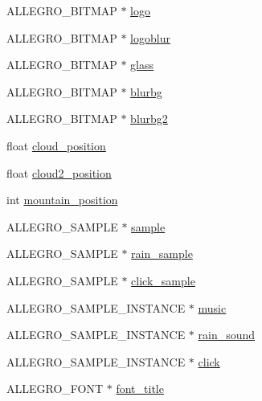 \begin{DoxyCompactItemize}
A\+L\+L\+E\+G\+R\+O\+\_\+\+B\+I\+T\+M\+A\+P $\ast$ \hyperlink{structMenuResources_a11983415130445869f26bda4d12272e6}{logo}
\item 
A\+L\+L\+E\+G\+R\+O\+\_\+\+B\+I\+T\+M\+A\+P $\ast$ \hyperlink{structMenuResources_a3dfab6a60817a4d1ca567c972e95f8b3}{logoblur}
\item 
A\+L\+L\+E\+G\+R\+O\+\_\+\+B\+I\+T\+M\+A\+P $\ast$ \hyperlink{structMenuResources_a46790a4783f1ab503b94de8e0d1ee587}{glass}
\item 
A\+L\+L\+E\+G\+R\+O\+\_\+\+B\+I\+T\+M\+A\+P $\ast$ \hyperlink{structMenuResources_a8e652f336e85c83f1ddfeb7cf093fcfe}{blurbg}
\item 
A\+L\+L\+E\+G\+R\+O\+\_\+\+B\+I\+T\+M\+A\+P $\ast$ \hyperlink{structMenuResources_a531163276d29cb01f2f7101ce460bc07}{blurbg2}
\item 
float \hyperlink{structMenuResources_a11df2c99d7ff4f2435a02c8a162c99fd}{cloud\+\_\+position}
\item 
float \hyperlink{structMenuResources_aef1e5d473ec00f1af2811cfcf45703bf}{cloud2\+\_\+position}
\item 
int \hyperlink{structMenuResources_a938793327e62bf52beb12782a0aeb7c4}{mountain\+\_\+position}
\item 
A\+L\+L\+E\+G\+R\+O\+\_\+\+S\+A\+M\+P\+L\+E $\ast$ \hyperlink{structMenuResources_af265bb06ac4cdcc8c2af9c59d33f5846}{sample}
\item 
A\+L\+L\+E\+G\+R\+O\+\_\+\+S\+A\+M\+P\+L\+E $\ast$ \hyperlink{structMenuResources_adf2448b5a6e212459cf17c1bcc1b6dd5}{rain\+\_\+sample}
\item 
A\+L\+L\+E\+G\+R\+O\+\_\+\+S\+A\+M\+P\+L\+E $\ast$ \hyperlink{structMenuResources_af61b149138ed96a053d19dc4a26edda1}{click\+\_\+sample}
\item 
A\+L\+L\+E\+G\+R\+O\+\_\+\+S\+A\+M\+P\+L\+E\+\_\+\+I\+N\+S\+T\+A\+N\+C\+E $\ast$ \hyperlink{structMenuResources_a33e189b8424eb9234bb642f3ad41fbb6}{music}
\item 
A\+L\+L\+E\+G\+R\+O\+\_\+\+S\+A\+M\+P\+L\+E\+\_\+\+I\+N\+S\+T\+A\+N\+C\+E $\ast$ \hyperlink{structMenuResources_a5d1081472b68e6303298a3853e04f0b2}{rain\+\_\+sound}
\item 
A\+L\+L\+E\+G\+R\+O\+\_\+\+S\+A\+M\+P\+L\+E\+\_\+\+I\+N\+S\+T\+A\+N\+C\+E $\ast$ \hyperlink{structMenuResources_ad22d0877f4bfee98acd1043b32b9d36a}{click}
\item 
A\+L\+L\+E\+G\+R\+O\+\_\+\+F\+O\+N\+T $\ast$ \hyperlink{structMenuResources_aab27cf02d971e4c9c9f2c4398357dc3a}{font\+\_\+title}
\item 

\end{DoxyCompactItemize}
